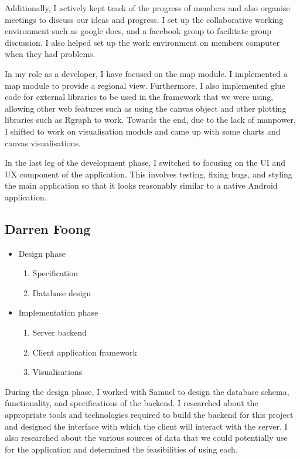 \documentclass[12pt,a4paper,twoside]{article}
\begin{document}
Additionally, I actively kept track of the progress of members and also organise meetings to discuss our ideas and progress. I set up the collaborative working environment such as google docs, and a facebook group to facilitate group discussion. I also helped set up the work environment on members computer when they had problems.

In my role as a developer, I have focused on the map module. I implemented a map module to provide a regional view. Furthermore, I also implemented glue code for external libraries to be used in the framework that we were using, allowing other web features such as using the canvas object and other plotting libraries such as Rgraph to work. Towards the end, due to the lack of manpower, I shifted to work on visualisation module and came up with some charts and canvas visualisations.

In the last leg of the development phase, I switched to focusing on the UI and UX component of the application. This involves testing, fixing bugs, and styling the main application so that it looks reasonably similar to a native Android application.

\subsection{Darren Foong}

\begin{itemize}
	\item Design phase
	\begin{enumerate}
		\item Specification
		\item Database design
	\end{enumerate}
	\item Implementation phase
	\begin{enumerate}
		\item Server backend
		\item Client application framework
		\item Visualisations
	\end{enumerate}
\end{itemize}

During the design phase, I worked with Samuel to design the database schema, functionality, and specifications of the backend. I researched about the appropriate tools and technologies required to build the backend for this project and designed the interface with which the client will interact with the server. I also researched about the various sources of data that we could potentially use for the application and determined the feasibilities of using each.
\end{document}
